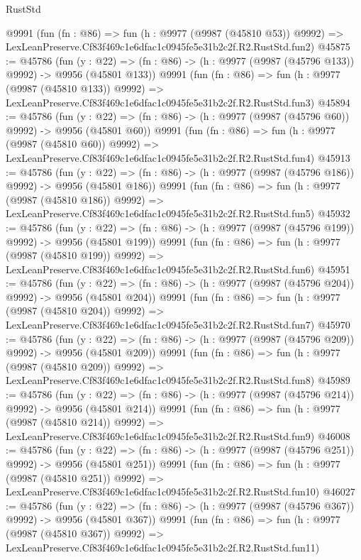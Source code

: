 \begin{lexlean}{RustStd}
\begin{coremodule}
    @9991
    (fun (fn : @86) =>
    fun (h : @9977 (@9987 (@45810 @53)) @9992) =>
    LexLeanPreserve.Cf83f469c1e6dfac1c0945fe5e31b2c2f.R2.RustStd.fun2)
@45875 := @45786
    (fun (y : @22) => (fn : @86) -> (h : @9977 (@9987 (@45796 @133)) @9992) -> @9956 (@45801 @133))
    @9991
    (fun (fn : @86) =>
    fun (h : @9977 (@9987 (@45810 @133)) @9992) =>
    LexLeanPreserve.Cf83f469c1e6dfac1c0945fe5e31b2c2f.R2.RustStd.fun3)
@45894 := @45786
    (fun (y : @22) => (fn : @86) -> (h : @9977 (@9987 (@45796 @60)) @9992) -> @9956 (@45801 @60))
    @9991
    (fun (fn : @86) =>
    fun (h : @9977 (@9987 (@45810 @60)) @9992) =>
    LexLeanPreserve.Cf83f469c1e6dfac1c0945fe5e31b2c2f.R2.RustStd.fun4)
@45913 := @45786
    (fun (y : @22) => (fn : @86) -> (h : @9977 (@9987 (@45796 @186)) @9992) -> @9956 (@45801 @186))
    @9991
    (fun (fn : @86) =>
    fun (h : @9977 (@9987 (@45810 @186)) @9992) =>
    LexLeanPreserve.Cf83f469c1e6dfac1c0945fe5e31b2c2f.R2.RustStd.fun5)
@45932 := @45786
    (fun (y : @22) => (fn : @86) -> (h : @9977 (@9987 (@45796 @199)) @9992) -> @9956 (@45801 @199))
    @9991
    (fun (fn : @86) =>
    fun (h : @9977 (@9987 (@45810 @199)) @9992) =>
    LexLeanPreserve.Cf83f469c1e6dfac1c0945fe5e31b2c2f.R2.RustStd.fun6)
@45951 := @45786
    (fun (y : @22) => (fn : @86) -> (h : @9977 (@9987 (@45796 @204)) @9992) -> @9956 (@45801 @204))
    @9991
    (fun (fn : @86) =>
    fun (h : @9977 (@9987 (@45810 @204)) @9992) =>
    LexLeanPreserve.Cf83f469c1e6dfac1c0945fe5e31b2c2f.R2.RustStd.fun7)
@45970 := @45786
    (fun (y : @22) => (fn : @86) -> (h : @9977 (@9987 (@45796 @209)) @9992) -> @9956 (@45801 @209))
    @9991
    (fun (fn : @86) =>
    fun (h : @9977 (@9987 (@45810 @209)) @9992) =>
    LexLeanPreserve.Cf83f469c1e6dfac1c0945fe5e31b2c2f.R2.RustStd.fun8)
@45989 := @45786
    (fun (y : @22) => (fn : @86) -> (h : @9977 (@9987 (@45796 @214)) @9992) -> @9956 (@45801 @214))
    @9991
    (fun (fn : @86) =>
    fun (h : @9977 (@9987 (@45810 @214)) @9992) =>
    LexLeanPreserve.Cf83f469c1e6dfac1c0945fe5e31b2c2f.R2.RustStd.fun9)
@46008 := @45786
    (fun (y : @22) => (fn : @86) -> (h : @9977 (@9987 (@45796 @251)) @9992) -> @9956 (@45801 @251))
    @9991
    (fun (fn : @86) =>
    fun (h : @9977 (@9987 (@45810 @251)) @9992) =>
    LexLeanPreserve.Cf83f469c1e6dfac1c0945fe5e31b2c2f.R2.RustStd.fun10)
@46027 := @45786
    (fun (y : @22) => (fn : @86) -> (h : @9977 (@9987 (@45796 @367)) @9992) -> @9956 (@45801 @367))
    @9991
    (fun (fn : @86) =>
    fun (h : @9977 (@9987 (@45810 @367)) @9992) =>
    LexLeanPreserve.Cf83f469c1e6dfac1c0945fe5e31b2c2f.R2.RustStd.fun11)

\end{coremodule}
\end{lexlean}
